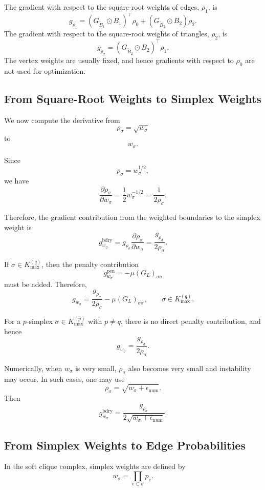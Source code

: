 \documentclass[pdflatex,sn-mathphys-ay]{sn-jnl}%
\theoremstyle{thmstyleone}%
\theoremstyle{thmstyletwo}%
\theoremstyle{thmstylethree}%
\begin{document}
\begin{appendices}
The gradient with respect to the square-root weights of edges, \(\rho_1\), is
\[
g_{\rho_1}
=
\left(
G_{\widetilde{B}_1}
\odot
B_1
\right)^\top
\rho_0
+
\left(
G_{\widetilde{B}_2}
\odot
B_2
\right)
\rho_2.
\]
The gradient with respect to the square-root weights of triangles, \(\rho_2\), is
\[
g_{\rho_2}
=
\left(
G_{\widetilde{B}_2}
\odot
B_2
\right)^\top
\rho_1.
\]
The vertex weights are usually fixed, and hence gradients with respect to \(\rho_0\) are not used for optimization.

\subsection{From Square-Root Weights to Simplex Weights}

We now compute the derivative from
\[
\rho_\sigma
=
\sqrt{w_\sigma}
\]
to
\[
w_\sigma.
\]

Since
\[
\rho_\sigma
=
w_\sigma^{1/2},
\]
we have
\[
\frac{\partial \rho_\sigma}{\partial w_\sigma}
=
\frac{1}{2}
w_\sigma^{-1/2}
=
\frac{1}{2\rho_\sigma}.
\]

Therefore, the gradient contribution from the weighted boundaries to the simplex weight is
\[
g_{w_\sigma}^{\mathrm{bdry}}
=
g_{\rho_\sigma}
\frac{\partial \rho_\sigma}{\partial w_\sigma}
=
\frac{g_{\rho_\sigma}}{2\rho_\sigma}.
\]

If \(\sigma\in K_{\max}^{(q)}\), then the penalty contribution
\[
g_{w_\sigma}^{\mathrm{pen}}
=
-\mu(G_L)_{\sigma\sigma}
\]
must be added. Therefore,
\[
g_{w_\sigma}
=
\frac{g_{\rho_\sigma}}{2\rho_\sigma}
-
\mu(G_L)_{\sigma\sigma},
\qquad
\sigma\in K_{\max}^{(q)}.
\]

For a \(p\)-simplex \(\sigma\in K_{\max}^{(p)}\) with \(p\ne q\), there is no direct penalty contribution, and hence
\[
g_{w_\sigma}
=
\frac{g_{\rho_\sigma}}{2\rho_\sigma}.
\]

Numerically, when \(w_\sigma\) is very small, \(\rho_\sigma\) also becomes very small and instability may occur. In such cases, one may use
\[
\rho_\sigma
=
\sqrt{w_\sigma+\epsilon_{\mathrm{num}}}.
\]
Then
\[
g_{w_\sigma}^{\mathrm{bdry}}
=
\frac{g_{\rho_\sigma}}{2\sqrt{w_\sigma+\epsilon_{\mathrm{num}}}}.
\]

\subsection{From Simplex Weights to Edge Probabilities}

In the soft clique complex, simplex weights are defined by
\[
w_\sigma
=
\prod_{e\subset\sigma}p_e.
\]


\end{appendices}
\end{document}
